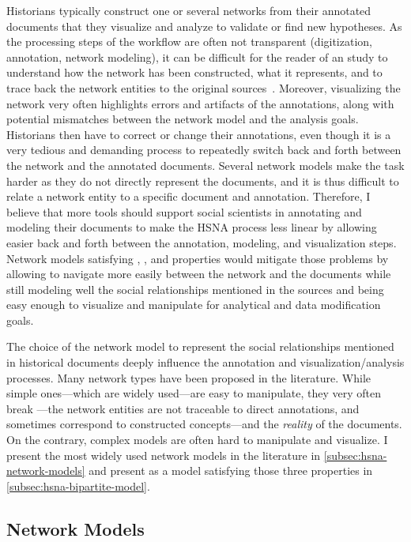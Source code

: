Historians typically construct one or several networks from their annotated documents that they visualize and analyze to validate or find new hypotheses.
As the processing steps of the workflow are often not transparent (digitization, annotation, network modeling), it can be difficult for the reader of an \hsna study to understand how the network has been constructed, what it represents, and to trace back the network entities to the original sources~\cite{dufournaudCommentRendreVisible2018}.
Moreover, visualizing the network very often highlights errors and artifacts of the annotations, along with potential mismatches between the network model and the analysis goals.
Historians then have to correct or change their annotations, even though it is a very tedious and demanding process to repeatedly switch back and forth between the network and the annotated documents.
Several network models make the task harder as they do not directly represent the documents, and it is thus difficult to relate a network entity to a specific document and annotation.
Therefore, I believe that more \va tools should support social scientists in annotating and modeling their documents to make the HSNA process less linear by allowing easier back and forth between the annotation, modeling, and visualization steps.
Network models satisfying  \traceability, \reality, and \simplicity properties would mitigate those problems by allowing to navigate more easily between the network and the documents while still modeling well the social relationships mentioned in the sources and being easy enough to visualize and manipulate for analytical and data modification goals.

The choice of the network model to represent the social relationships mentioned in historical documents deeply influence the annotation and visualization/analysis processes.
Many network types have been proposed in the literature.
While simple ones---which are widely used---are easy to manipulate, they very often break \traceability---the network entities are not traceable to direct annotations, and sometimes correspond to constructed concepts---and the \emph{reality} of the documents.
On the contrary, complex models are often hard to manipulate and visualize.
I present the most widely used network models in the \hsna literature in \autoref{subsec:hsna-network-models} and present \modelplural as a model satisfying those three properties in \autoref{subsec:hsna-bipartite-model}.

\subsection{Network Models}\label{subsec:hsna-network-models}

